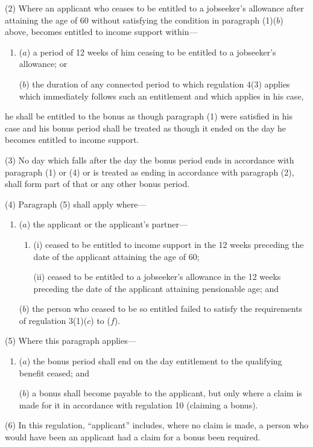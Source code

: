\documentclass[a4paper]{article}
\begin{document}
(2) Where an applicant who ceases to be entitled to a jobseeker’s allowance after attaining the age of 60 without satisfying the condition in paragraph (1)($b$) above, becomes entitled to income support within—
\begin{enumerate}\item[]
($a$) a period of 12 weeks of him ceasing to be entitled to a jobseeker’s allowance; or

($b$) the duration of any connected period to which regulation 4(3) applies which immediately follows such an entitlement and which applies in his case,
\end{enumerate}
he shall be entitled to the bonus as though paragraph (1) were satisfied in his case and his bonus period shall be treated as though it ended on the day he becomes entitled to income support.

(3) No day which falls after the day the bonus period ends in accordance with paragraph (1) or (4) or is treated as ending in accordance with paragraph (2), shall form part of that or any other bonus period.

(4) Paragraph (5) shall apply where—
\begin{enumerate}\item[]
($a$) the applicant or the applicant’s partner—
\begin{enumerate}\item[]
(i) ceased to be entitled to income support in the 12 weeks preceding the date of the applicant attaining the age of 60;

(ii) ceased to be entitled to a jobseeker’s allowance in the 12 weeks preceding the date of the applicant attaining pensionable age; and
\end{enumerate}

($b$) the person who ceased to be so entitled failed to satisfy the requirements of regulation 3(1)($c$) to ($f$).
\end{enumerate}

(5) Where this paragraph applies—
\begin{enumerate}\item[]
($a$) the bonus period shall end on the day entitlement to the qualifying benefit ceased; and

($b$) a bonus shall become payable to the applicant, but only where a claim is made for it in accordance with regulation 10 (claiming a bonus).
\end{enumerate}

(6) In this regulation, “applicant” includes, where no claim is made, a person who would have been an applicant had a claim for a bonus been required.
\end{document}
